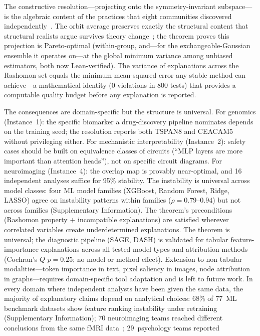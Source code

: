 \documentclass[11pt]{article}
\begin{document}
The constructive resolution---projecting onto the symmetry-invariant
subspace---is the algebraic content of the practices that eight
communities discovered independently~\citep{caraker2026ostrowski}.  The
orbit average preserves exactly the structural content that structural
realists argue survives theory change~\citep{ladyman2007every}; the
theorem proves this projection is Pareto-optimal (within-group, and---for the exchangeable-Gaussian ensemble it operates on---at the global minimum variance among unbiased estimators, both now Lean-verified).  The variance
of explanations across the Rashomon set equals the minimum
mean-squared error any stable method can achieve---a mathematical
identity (0 violations in 800 tests) that provides a computable quality
budget before any explanation is reported.

The consequences are domain-specific but the structure is universal.  For
genomics (Instance~1): the specific biomarker a drug-discovery pipeline
nominates depends on the training seed; the resolution reports both
TSPAN8 and CEACAM5 without privileging either.  For mechanistic
interpretability (Instance~2): safety cases should be built on
equivalence classes of circuits (``MLP layers are more important than
attention heads''), not on specific circuit diagrams.  For
neuroimaging (Instance~4): the overlap map is provably near-optimal, and
16 independent analyses suffice for 95\% stability.  The instability is
universal across model classes: four ML model families (XGBoost, Random
Forest, Ridge, LASSO) agree on instability patterns within families
($\rho = 0.79$--$0.94$) but not across families (Supplementary
Information).  The theorem's preconditions (Rashomon property $+$ incompatible
explanations) are satisfied wherever correlated variables create
underdetermined explanations.
The theorem is universal; the diagnostic pipeline (SAGE, DASH) is
validated for tabular feature-importance explanations across all tested
model types and attribution methods (Cochran's $Q$ $p = 0.25$; no
model or method effect).  Extension to non-tabular modalities---token
importance in text, pixel saliency in images, node attribution in
graphs---requires domain-specific tool adaptation and is left to future
work.
In every domain where independent analysts have been given the same data,
the majority of explanatory claims depend on analytical
choices: 68\% of 77~ML benchmark datasets show feature ranking
instability under retraining (Supplementary Information); 70
neuroimaging teams reached different conclusions from the same fMRI
data~\citep{botviniknezer2020variability}; 29~psychology teams reported
\end{document}
